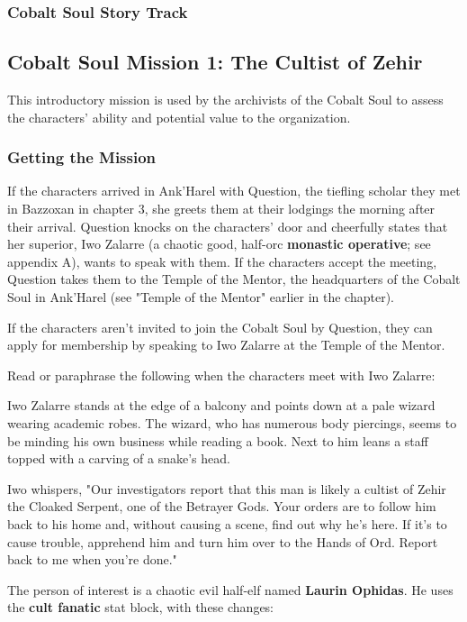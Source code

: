 \documentclass[10pt,a4paper,twoside,fancy,bg=print,twocolumn,openany,nodeprecatedcode]{dndbook}
\begin{document}
\subsubsection{Cobalt Soul Story Track}
\subsection{Cobalt Soul Mission 1: The Cultist of Zehir}
This introductory mission is used by the archivists of the Cobalt Soul to assess the characters' ability and potential value to the organization.

\subsubsection{Getting the Mission}
If the characters arrived in Ank'Harel with Question, the tiefling scholar they met in Bazzoxan in chapter 3, she greets them at their lodgings the morning after their arrival. Question knocks on the characters' door and cheerfully states that her superior, Iwo Zalarre (a chaotic good, half-orc \textbf{monastic operative}; see appendix A), wants to speak with them. If the characters accept the meeting, Question takes them to the Temple of the Mentor, the headquarters of the Cobalt Soul in Ank'Harel (see "Temple of the Mentor" earlier in the chapter).

If the characters aren't invited to join the Cobalt Soul by Question, they can apply for membership by speaking to Iwo Zalarre at the Temple of the Mentor.

Read or paraphrase the following when the characters meet with Iwo Zalarre:

\begin{DndReadAloud}{}
Iwo Zalarre stands at the edge of a balcony and points down at a pale wizard wearing academic robes. The wizard, who has numerous body piercings, seems to be minding his own business while reading a book. Next to him leans a staff topped with a carving of a snake's head.

Iwo whispers, "Our investigators report that this man is likely a cultist of Zehir the Cloaked Serpent, one of the Betrayer Gods. Your orders are to follow him back to his home and, without causing a scene, find out why he's here. If it's to cause trouble, apprehend him and turn him over to the Hands of Ord. Report back to me when you're done."

\end{DndReadAloud}

The person of interest is a chaotic evil half-elf named \textbf{Laurin Ophidas}. He uses the \textbf{cult fanatic} stat block, with these changes:
\end{document}

